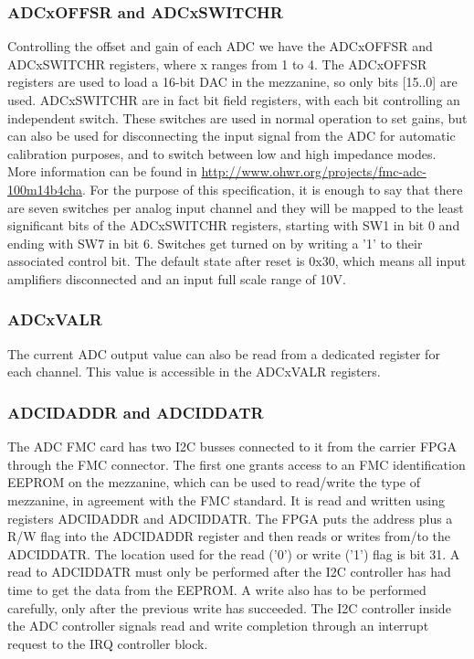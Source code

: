 \documentclass[a4paper]{article}
\begin{document}
\subsubsection{ADCxOFFSR and ADCxSWITCHR}
\label{sssec:gain_offs}
Controlling the offset and gain of each ADC we have the ADCxOFFSR and ADCxSWITCHR registers, where x ranges from 1 to 4. The ADCxOFFSR registers are used to load a 16-bit DAC in the mezzanine, so only bits [15..0] are used. ADCxSWITCHR are in fact bit field registers, with each bit controlling an independent switch. These switches are used in normal operation to set gains, but can also be used for disconnecting the input signal from the ADC for automatic calibration purposes, and to switch between low and high impedance modes. More information can be found in \href{http://www.ohwr.org/projects/fmc-adc-100m14b4cha}{http://www.ohwr.org/projects/fmc-adc-100m14b4cha}. For the purpose of this specification, it is enough to say that there are seven switches per analog input channel and they will be mapped to the least significant bits of the ADCxSWITCHR registers, starting with SW1 in bit 0 and ending with SW7 in bit 6. Switches get turned on by writing a '1' to their associated control bit. The default state after reset is 0x30, which means all input amplifiers disconnected and an input full scale range of 10V.

\subsubsection{ADCxVALR}
The current ADC output value can also be read from a dedicated register for each channel. This value is accessible in the ADCxVALR registers.

\subsubsection{ADCIDADDR and ADCIDDATR}
The ADC FMC card has two I2C busses connected to it from the carrier FPGA through the FMC connector. The first one grants access to an FMC identification EEPROM on the mezzanine, which can be used to read/write the type of mezzanine, in agreement with the FMC standard. It is read and written using registers ADCIDADDR and ADCIDDATR. The FPGA puts the address plus a R/W flag into the ADCIDADDR register and then reads or writes from/to the ADCIDDATR. The location used for the read ('0') or write ('1') flag is bit 31. A read to ADCIDDATR must only be performed after the I2C controller has had time to get the data from the EEPROM. A write also has to be performed carefully, only after the previous write has succeeded. The I2C controller inside the ADC controller signals read and write completion through an interrupt request to the IRQ controller block. 
\end{document}
